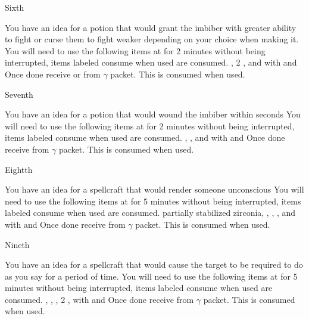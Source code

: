 \documentclass[greennotebook]{guildcamp3} %
\begin{document}
\begin{page}{Sixth}
	
	You have an idea for a potion that would grant the imbiber with greater ability to fight or curse them to fight weaker depending on your choice when making it.
	You will need to use the following items at \sMageWorkbench{} for 2 minutes without being interrupted, items labeled consume when used are consumed.
	\iUnicornHoof{}, 2 \iHolyWater{}, and \iCompoundNine{} with \iMortarPestle{} and \iSieve{}
	Once done receive \iCRUpPotion{} or \iCRDownPotion{} from $\gamma$ packet. This is consumed when used. 
	
\end{page}

\begin{page}{Seventh}
	
	You have an idea for a potion that would wound the imbiber within seconds
	You will need to use the following items at \sMageWorkbench{} for 2 minutes without being interrupted, items labeled consume when used are consumed.
	\iBelladonna{}, \iWerewolfFang{}, and \iBloodPlasma{} with \iCursedTome{} and \iVial{}
	Once done receive \iMagicPoison{} from $\gamma$ packet. This is consumed when used. 
	
\end{page}

\begin{page}{Eightth}
	
	You have an idea for a spellcraft that would render someone unconscious
	You will need to use the following items at \sMageWorkbench{} for 5 minutes without being interrupted, items labeled consume when used are consumed.
	partially stabilized zirconia, \iWerewolfFang{}, \iDragonSkin{}, \iCompoundNine{}, and \iOil{} with \iPlumbicRod{} and \iCauldron{}
	Once done receive \iKOSpell{} from $\gamma$ packet. This is consumed when used. 
	
\end{page}

\begin{page}{Nineth}
	
	You have an idea for a spellcraft that would cause the target to be required to do as you say for a period of time.
	You will need to use the following items at \sMageWorkbench{} for 5 minutes without being interrupted, items labeled consume when used are consumed.
	\iPhoenixFeather{}, \iUnicornHoof{}, \iStardust{}, 2 \iHolyWater{}, \iNiobiumCarbide{} with and \iSieve{}
	Once done receive \iMCSpell{} from $\gamma$ packet. This is consumed when used. 
	
\end{page}
\end{document}
